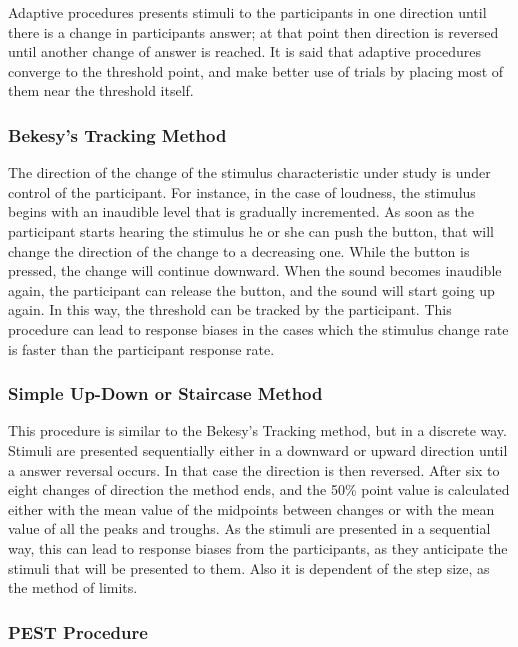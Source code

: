 \documentclass[../main.tex]{subfiles}
\begin{document}
\begin{theoreticalbackground}
Adaptive procedures presents stimuli to the participants in one direction until
there is a change in participants answer; at that point then direction is
reversed until another change of answer is reached. It is said that adaptive
procedures converge to the threshold point, and make better use of trials by
placing most of them near the threshold itself.

\subsubsection{Bekesy's Tracking Method}

The direction of the change of the stimulus characteristic under study is under
control of the participant. For instance, in the case of loudness, the stimulus
begins with an inaudible level that is gradually incremented. As soon as the
participant starts hearing the stimulus he or she can push the button, that will
change the direction of the change to a decreasing one. While the button is
pressed, the change will continue downward. When the sound becomes inaudible
again, the participant can release the button, and the sound will start going
up again. In this way, the threshold can be tracked by the participant. This
procedure can lead to response biases in the cases which the stimulus change
rate is faster than the participant response rate.

\subsubsection{Simple Up-Down or Staircase Method}

This procedure is similar to the Bekesy's Tracking method, but in a discrete
way. Stimuli are presented sequentially either in a downward or upward direction
until a answer reversal occurs. In that case the direction is then reversed.
After six to eight changes of direction the method ends, and the 50\% point
value is calculated either with the mean value of the midpoints between changes
or with the mean value of all the peaks and troughs. As the stimuli are
presented in a sequential way, this can lead to response biases from the
participants, as they anticipate the stimuli that will be presented to them.
Also it is dependent of the step size, as the method of limits.

\subsubsection{PEST Procedure}


\end{theoreticalbackground}
\end{document}
